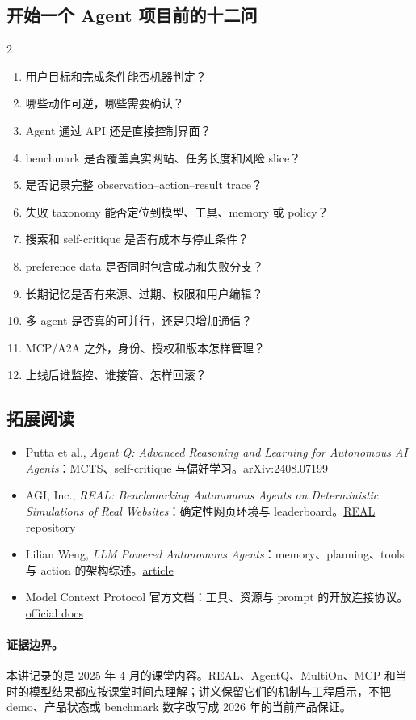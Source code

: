 \subsection{开始一个 Agent 项目前的十二问}

\begin{multicols}{2}
\small
\begin{enumerate}
  \item 用户目标和完成条件能否机器判定？
  \item 哪些动作可逆，哪些需要确认？
  \item Agent 通过 API 还是直接控制界面？
  \item benchmark 是否覆盖真实网站、任务长度和风险 slice？
  \item 是否记录完整 observation--action--result trace？
  \item 失败 taxonomy 能否定位到模型、工具、memory 或 policy？
  \item 搜索和 self-critique 是否有成本与停止条件？
  \item preference data 是否同时包含成功和失败分支？
  \item 长期记忆是否有来源、过期、权限和用户编辑？
  \item 多 agent 是否真的可并行，还是只增加通信？
  \item MCP/A2A 之外，身份、授权和版本怎样管理？
  \item 上线后谁监控、谁接管、怎样回滚？
\end{enumerate}
\normalsize
\end{multicols}

\subsection{拓展阅读}

\begin{itemize}
  \item Putta et al., \emph{Agent Q: Advanced Reasoning and Learning for Autonomous AI Agents}：MCTS、self-critique 与偏好学习。\href{https://arxiv.org/abs/2408.07199}{arXiv:2408.07199}
  \item AGI, Inc., \emph{REAL: Benchmarking Autonomous Agents on Deterministic Simulations of Real Websites}：确定性网页环境与 leaderboard。\href{https://github.com/agi-inc/real}{REAL repository}
  \item Lilian Weng, \emph{LLM Powered Autonomous Agents}：memory、planning、tools 与 action 的架构综述。\href{https://lilianweng.github.io/posts/2023-06-23-agent/}{article}
  \item Model Context Protocol 官方文档：工具、资源与 prompt 的开放连接协议。\href{https://modelcontextprotocol.io/}{official docs}
\end{itemize}

\paragraph{证据边界。}
本讲记录的是 2025 年 4 月的课堂内容。REAL、AgentQ、MultiOn、MCP 和当时的模型结果都应按课堂时间点理解；讲义保留它们的机制与工程启示，不把 demo、产品状态或 benchmark 数字改写成 2026 年的当前产品保证。



